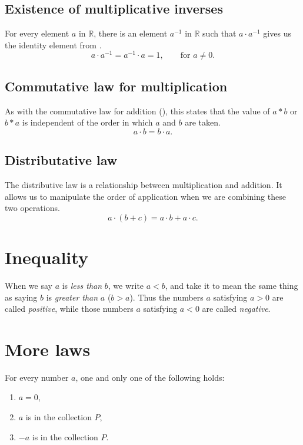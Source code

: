 \subsection{Existence of multiplicative inverses}
For every element $a$ in $\mathbb{R}$, there is an element $a^{-1}$ in 
$\mathbb{R}$ such that $a \cdot a^{-1}$ gives us the identity element
from .
\begin{equation}
    a \cdot a^{-1} = a^{-1} \cdot a = 1, \qquad \text{for } a \neq 0.
\end{equation}

\subsection{Commutative law for multiplication}
As with the commutative law for addition (),
this states that the value of $a * b$ or $b * a$ is independent of the order
in which $a$ and $b$ are taken.\cite[p.~14]{pinter}
\begin{equation}
    a \cdot b = b \cdot a.
\end{equation}

\subsection{Distributative law}
The distributive law is a relationship between multiplication and addition.
It allows us to manipulate the order of application when we are combining these
two operations.
\begin{equation}
    a \cdot (b + c) = a \cdot b + a \cdot c.
\end{equation}

\section{Inequality}
When we say $a$ is 
\emph{less than}
$b$, we write $a < b$,
and take it to mean the same thing as saying $b$ is 
\emph{greater than}
$a$ ($b > a$).\cite[p.~9]{spivak}
Thus the numbers $a$ satisfying $a > 0$ are called \emph{positive}, while
those numbers $a$ satisfying $a < 0$ are called \emph{negative}.

\section{More laws}
\begin{theorem}
For every number $a$, one and only one of the following holds:
\begin{enumerate}
    \item $a = 0$,
    \item $a$ is in the collection $P$,
    \item $-a$ is in the collection $P$.
\end{enumerate}
\cite[p.~9]{spivak}
\end{theorem}

